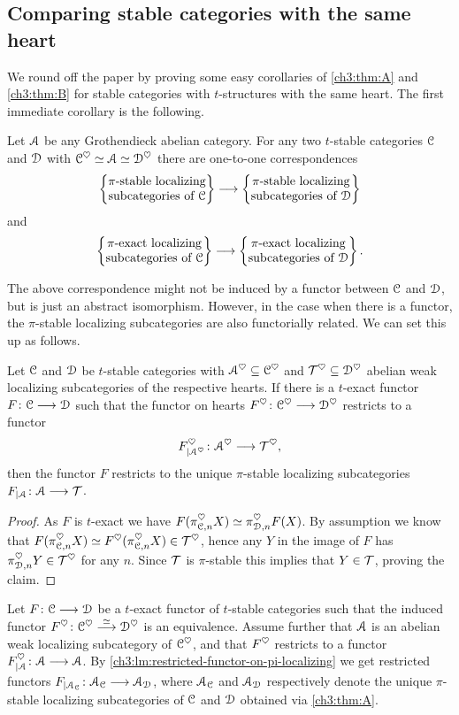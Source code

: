 \subsection{Comparing stable categories with the same heart}

We round off the paper by proving some easy corollaries of \cref{ch3:thm:A} and \cref{ch3:thm:B} for stable categories with $t$-structures with the same heart. The first immediate corollary is the following. 

\begin{corollary}
    Let $\A$ be any Grothendieck abelian category. For any two $t$-stable categories $\C$ and $\D$ with $\C^\heart \simeq \A\simeq \D^\heart$ there are one-to-one correspondences
    \[\pistable\to\pistableD\]
    and 
    \[\piexact\to \piexactD.\]
\end{corollary}

The above correspondence might not be induced by a functor between $\C$ and $\D$, but is just an abstract isomorphism. However, in the case when there is a functor, the $\pi$-stable localizing subcategories are also functorially related. We can set this up as follows. 

\begin{lemma}
    \label{ch3:lm:restricted-functor-on-pi-localizing}
    Let $\C$ and $\D$ be $t$-stable categories with $\A^\heart\subseteq \C^\heart$ and $\T^\heart\subseteq \D^\heart$ abelian weak localizing subcategories of the respective hearts. 
    If there is a $t$-exact functor $F\:\C\to \D$ such that the functor on hearts $F^\heart\: \C^\heart\to \D^\heart$ restricts to a functor 
    \[F^\heart_{\vert \A^\heart}\: \A^\heart \to \T^\heart,\]
    then the functor $F$ restricts to the unique $\pi$-stable localizing subcategories $F_{\vert \A}\:\A\to \T$. 
\end{lemma}
\begin{proof}
    As $F$ is $t$-exact we have $F(\pi_{\C,n}^\heart X)\simeq \pi_{\D, n}^\heart F(X)$. By assumption we know that $F(\pi_{\C,n}^{\heart}X) \simeq F^\heart(\pi_{\C,n}^\heart X) \in \T^\heart$, hence any $Y$ in the image of $F$ has $\pi_{\D,n}^\heart Y \in \T^\heart$ for any $n$. Since $\T$ is $\pi$-stable this implies that $Y\in \T$, proving the claim.
\end{proof}

Let $F\:\C\to\D$ be a $t$-exact functor of $t$-stable categories such that the induced functor $F^\heart \: \C^\heart\overset{\simeq}\to \D^\heart$ is an equivalence. Assume further that $\A$ is an abelian weak localizing subcategory of $\C^\heart$, and that $F^\heart$ restricts to a functor $F^\heart_{\vert \A}\:\A\to\A$. By \cref{ch3:lm:restricted-functor-on-pi-localizing} we get restricted functors $F_{\vert \A_\C}\: \A_\C \to \A_\D$, where $\A_\C$ and $\A_\D$ respectively denote the unique $\pi$-stable localizing subcategories of $\C$ and $\D$ obtained via \cref{ch3:thm:A}.

